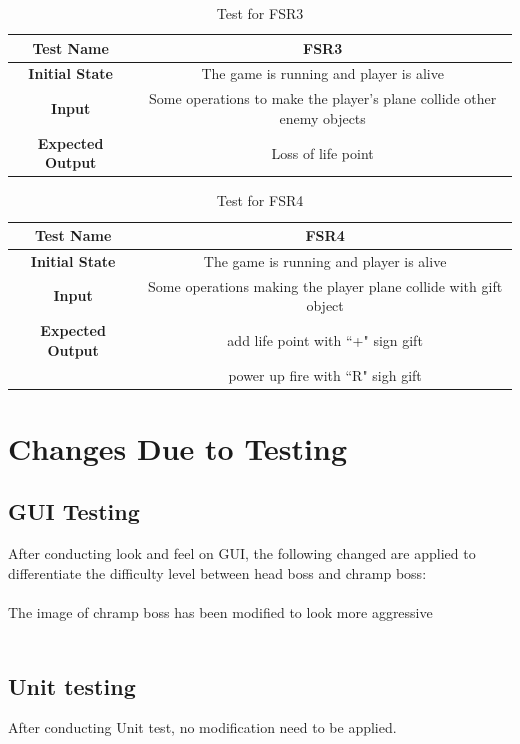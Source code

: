 \documentclass[12,english]{article}
\begin{document}
\begin{table}[!htbp]
\begin{tabular}{|c|c|}
\hline
\textbf{Test Name} & FSR3\\
\hline
\textbf{Initial State} &The game is running and player is alive\\
\hline
\textbf{Input} &Some operations to make the player's plane collide other enemy objects\\
\hline
\textbf{Expected Output}&Loss of life point\\
\hline
\end{tabular}
\caption{Test for FSR3}
\label{Table}
\end{table}

\begin{table}[!htbp]
\begin{tabular}{|c|c|}
\hline
\textbf{Test Name} & FSR4\\
\hline
\textbf{Initial State} &The game is running and player is alive\\
\hline
\textbf{Input} &Some operations making the player plane collide with gift object\\
\hline
\textbf{Expected Output}&add life point with ``+" sign gift\\
& power up fire with ``R" sigh gift\\
\hline
\end{tabular}
\caption{Test for FSR4}
\label{Table}
\end{table}

\section{Changes Due to Testing}				


	\subsection{GUI Testing}
	After conducting look and feel on GUI, the following changed are applied to differentiate the difficulty level between head boss and chramp boss:\\
	\\
	The image of chramp boss has been modified to look more aggressive\\
	\\
	
	\subsection{Unit testing}
	After conducting Unit test, no modification need to be applied. 
\end{document}
